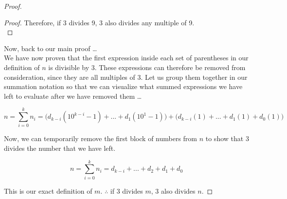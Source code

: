 \documentclass[12pt]{article}
\begin{document}
\begin{proof}
\begin{proof}
Therefore, if 3 divides 9, 3 also divides any multiple of 9.\\
\end{proof}

\bigskip
Now, back to our main proof \ldots \\

We have now proven that the first expression inside each set of parentheses in our definition of $n$ is divisible by 3. These expressions can therefore be removed from consideration, since they are all multiples of 3. Let us group them together in our summation notation so that we can visualize what summed expressions we have left to evaluate after we have removed them \ldots

\begin{equation}
n = \sum_{i = 0}^{k} n_{i} = \mathbf{(}d_{k - i}(10^{k - i} - 1) + ... + d_{1}(10^{1} - 1)\mathbf{)} + \mathbf{(}d_{k - i}(1) + ... + d_{1}(1) + d_{0}(1)\mathbf{)}
\end{equation}
\bigskip

Now, we can temporarily remove the first block of numbers from $n$ to show that 3 divides the number that we have left. 

\begin{equation}
n = \sum_{i = 0}^{k} n_{i} = d_{k - i} + ... + d_{2} + d_{1} + d_{0}
\end{equation}
\bigskip 

This is our exact definition of $m$. $\therefore$ if 3 divides $m$, 3 also divides $n$. 
\end{proof}
\end{document}
